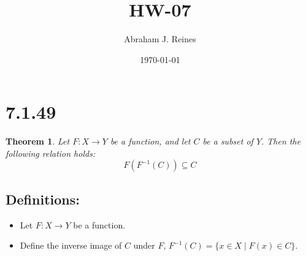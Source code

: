 \documentclass[12pt]{article}
\newtheorem{theorem}{Theorem}
\begin{document}
\doublespacing %

\title{HW-07}
\author{Abraham J. Reines}
\date{\today}
\maketitle

\section*{7.1.49}

\begin{theorem}
Let \( F: X \to Y \) be a function, and let \( C \) be a subset of \( Y \). Then the following relation holds:
\[ F(F^{-1}(C)) \subseteq C \]
\end{theorem}

\subsection*{Definitions:}
\begin{itemize}
    \item Let \( F: X \rightarrow Y \) be a function.
    \item Define the inverse image of \( C \) under \( F \), \( F^{-1}(C) = \{ x \in X \mid F(x) \in C \} \).
\end{itemize}
\end{document}
